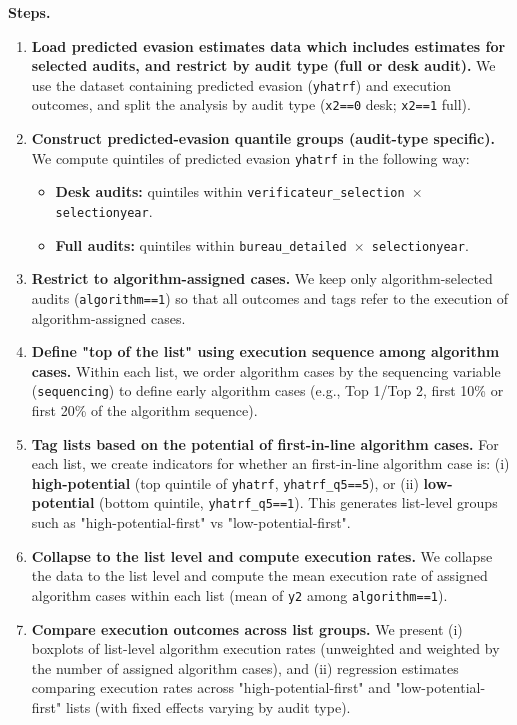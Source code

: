 \documentclass{article}
\begin{document}
\textbf{Steps.}
\begin{enumerate}
    \item \textbf{Load predicted evasion estimates data which includes estimates for selected audits, and restrict by audit type (full or desk audit).} 
    We use the dataset containing predicted evasion (\texttt{yhatrf}) and execution outcomes, and split the analysis by audit type (\texttt{x2==0} desk; \texttt{x2==1} full).

    \item \textbf{Construct predicted-evasion quantile groups (audit-type specific).}
    We compute quintiles of predicted evasion \texttt{yhatrf} in the following way:
    \begin{itemize}
        \item \textbf{Desk audits:} quintiles within \texttt{verificateur\_selection $\times$ selectionyear}.
        \item \textbf{Full audits:} quintiles within \texttt{bureau\_detailed $\times$ selectionyear}.
    \end{itemize}

    \item \textbf{Restrict to algorithm-assigned cases.}
    We keep only algorithm-selected audits (\texttt{algorithm==1}) so that all outcomes and tags refer to the execution of algorithm-assigned cases.

    \item \textbf{Define "top of the list" using execution sequence among algorithm cases.}
    Within each list, we order algorithm cases by the sequencing variable (\texttt{sequencing}) to define early algorithm cases (e.g., Top 1/Top 2, first 10\% or first 20\% of the algorithm sequence).

    \item \textbf{Tag lists based on the potential of first-in-line algorithm cases.}
    For each list, we create indicators for whether an first-in-line algorithm case is:
    (i) \textbf{high-potential} (top quintile of \texttt{yhatrf}, \texttt{yhatrf\_q5==5}), or 
    (ii) \textbf{low-potential} (bottom quintile, \texttt{yhatrf\_q5==1}).
    This generates list-level groups such as "high-potential-first" vs "low-potential-first".

    \item \textbf{Collapse to the list level and compute execution rates.}
    We collapse the data to the list level and compute the mean execution rate of assigned algorithm cases within each list (mean of \texttt{y2} among \texttt{algorithm==1}).

    \item \textbf{Compare execution outcomes across list groups.}
    We present (i) boxplots of list-level algorithm execution rates (unweighted and weighted by the number of assigned algorithm cases), and (ii) regression estimates comparing execution rates across "high-potential-first" and "low-potential-first" lists (with fixed effects varying by audit type).
\end{enumerate}
\end{document}
